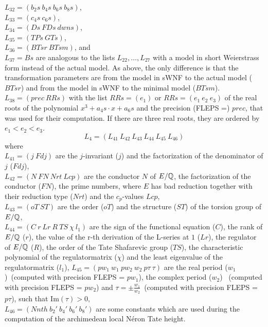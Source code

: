 $L_{32} = (b_2s\  b_4s\  b_6s\  b_8s)$, \\
$L_{33} = (c_4s\  c_6s)$, \\
$L_{34} = (Ds\  FDs\  dwns)$, \\
$L_{35} = (TPs\  GTs)$, \\
$L_{36} = (BTsr\  BTsm)$, and \\
$L_{37} = Bs$ are analogous to the lists 
$L_{22}, \ldots, L_{27}$ with a model in short Weierstrass form instead of the
actual model. As above, the
only difference is that the transformation parameters are from the model in
sWNF to the actual model ($BTsr$) and from the model in sWNF to the minimal
model ($BTsm$). \\
$L_{38} = (prec\ RRs)$ with the list $RRs = (e_1)$ or $RRs = (e_1\ e_2\ e_3)$ of the real roots of the polynomial $x^3+a_4s\cdot x+a_6s$ and the precision (FLEPS =) $prec$, that was used for their computation. If there are three real roots, they are ordered by $e_1<e_2<e_3$.
\[L_4 = (L_{41}\  L_{42}\  L_{43}\  L_{44}\  L_{45}\  L_{46})\]
where \\
$L_{41} = (j\  Fdj)$ are the $j$-invariant ($j$) and the factorization of the
denominator of $j$ ($Fdj$), \\
$L_{42} = (N\  FN\  Nrt\  Lcp)$ are the conductor $N$ of $E/\mbox{$\mathbb Q$}$, the 
factorization of the conductor ($FN$), the prime numbers, where $E$ has bad
reduction together with their reduction type ($Nrt$) and the $c_p$-values $Lcp$, \\
$L_{43} = (oT\  ST)$ are the order ($oT$) and the structure ($ST$) of the 
torsion group of $E/\mbox{$\mathbb Q$}$,\\
$L_{44} = (C\  r\  Lr\  R\  TS\  \chi\ l_1)$ are the sign of the functional equation
($C$), the rank of $E/\mbox{$\mathbb Q$}$ ($r$), the value of the r-th derivation of the 
L-series at $1$ ($Lr$), the regulator of $E/\mbox{$\mathbb Q$}$ ($R$), the order of the
Tate Shafarevic group ($TS$), the characteristic polynomial of the 
regulatormatrix ($\chi$) and the least eigenvalue of the regulatormatrix ($l_1$),\newpage
$L_{45} = (pw_1\  w_1\  pw_2\  w_2\  p\tau\  \tau)$ are the real period ($w_1$)\ (computed with precision FLEPS = $pw_1$), the complex period
($w_2$) \ (computed with precision FLEPS = $pw_2$) and $\tau = \pm \frac{w_1}{w_2}$\ (computed with precision FLEPS = $p\tau$), such that Im$(\tau)>0$, \\
$L_{46} = (Nnth\  b_2'\  b_4'\  b_6'\  b_8')$ are some constants which are used
during the computation of the archimedean local N\'{e}ron Tate height.

